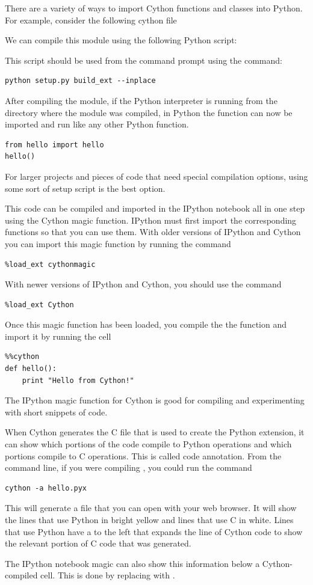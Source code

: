 There are a variety of ways to import Cython functions and classes into Python.
For example, consider the following cython file

We can compile this module using the following Python script:

This script should be used from the command prompt using the command:
\begin{lstlisting}[style=ShellInput]
python setup.py build_ext --inplace
\end{lstlisting}
After compiling the module, if the Python interpreter is running from the directory where the module was compiled, in Python the function can now be imported and run like any other Python function.
\begin{lstlisting}
from hello import hello
hello()
\end{lstlisting}
For larger projects and pieces of code that need special compilation options, using some sort of setup script is the best option.

This code can be compiled and imported in the IPython notebook all in one step using the Cython magic function.
IPython must first import the corresponding functions so that you can use them.
With older versions of IPython and Cython you can import this magic function by running the command
\begin{lstlisting}
%load_ext cythonmagic
\end{lstlisting}
With newer versions of IPython and Cython, you should use the command
\begin{lstlisting}
%load_ext Cython
\end{lstlisting}
Once this magic function has been loaded, you compile the the  function and import it by running the cell
\begin{lstlisting}
%%cython
def hello():
    print "Hello from Cython!"
\end{lstlisting}
The IPython magic function for Cython is good for compiling and experimenting with short snippets of code.

\begin{info}
When Cython generates the C file that is used to create the Python extension, it can show which portions of the code compile to Python operations and which portions compile to C operations.
This is called code annotation.
From the command line, if you were compiling , you could run the command
\begin{lstlisting}[style=ShellInput]
cython -a hello.pyx
\end{lstlisting}
This will generate a  file that you can open with your web browser.
It will show the lines that use Python in bright yellow and lines that use C in white.
Lines that use Python have a \li{+} to the left that expands the line of Cython code to show the relevant portion of C code that was generated.

The IPython notebook magic can also show this information below a Cython-compiled cell.
This is done by replacing  with .
\end{info}

